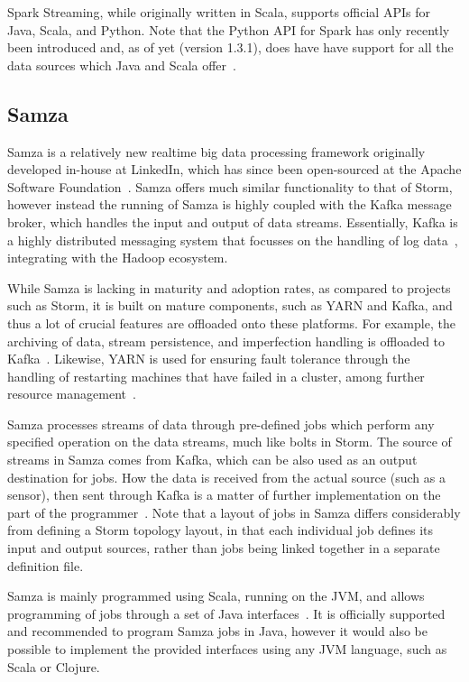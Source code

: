 Spark Streaming, while originally written in Scala, supports official APIs for Java, Scala, and Python. Note that the
Python API for Spark has only recently been introduced and, as of yet (version 1.3.1), does have have support for all
the data sources which Java and Scala offer~\cite{Spark5:online}.



\subsection{Samza} %
\label{ssub:samza}

Samza is a relatively new realtime big data processing framework originally developed in-house at LinkedIn, which has since been
open-sourced at the Apache Software Foundation~\cite{web_samza}. Samza offers much similar functionality to that of
Storm, however instead the running of Samza is highly coupled with the Kafka message broker, which handles the input
and output of data streams. Essentially, Kafka is a highly distributed messaging system that focusses on the handling
of log data~\cite{kreps2011kafka}, integrating with the Hadoop ecosystem.

While Samza is lacking in maturity and adoption rates, as compared to projects such as Storm, it is built on mature
components, such as YARN and Kafka, and thus a lot of crucial features are offloaded onto these platforms. For example,
the archiving of data, stream persistence, and imperfection handling is offloaded to Kafka~\cite{bockermann2014survey}.
Likewise, YARN is used for ensuring fault tolerance through the handling of restarting machines that have failed in a
cluster, among further resource management~\cite{bockermann2014survey}.

Samza processes streams of data through pre-defined jobs which perform any specified operation on the data streams, much
like bolts in Storm. The source of streams in Samza comes from Kafka, which can be also used as an output destination
for jobs. How the data is received from the actual source (such as a sensor), then sent through Kafka is a matter of
further implementation on the part of the programmer~\cite{yangradstack}. Note that a layout of jobs in Samza differs considerably from defining
a Storm topology layout, in that each individual job defines its input and output sources, rather than jobs being
linked together in a separate definition file.

Samza is mainly programmed using Scala, running on the JVM, and allows programming of jobs through a set of Java
interfaces~\cite{Samza6:online}. It is officially supported and recommended to program Samza jobs in Java, however it
would also be possible to implement the provided interfaces using any JVM language, such as Scala or Clojure.

